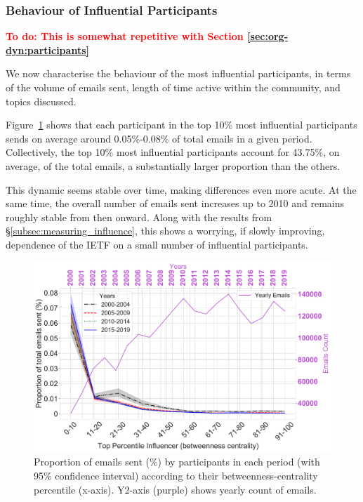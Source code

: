 \documentclass[twocolumn,10pt]{article}
\newlength{\figureWidthOneColumn}
\newcommand{\todo}[1]{\textbf{\textcolor{red}{To do: #1}}}
\newcommand{\pb}[1]{\vspace{0.75ex}\noindent{\textbf{#1}}}
\begin{document}
\subsubsection{Behaviour of Influential Participants}
\label{subsec:influencer_behaviour}

\todo{This is somewhat repetitive with Section \ref{sec:org-dyn:participants}}

We now characterise the behaviour of the most influential participants, in
terms of the volume of emails sent, length of time active within the
community, and topics discussed. 

\pb{Email volume}
Figure~\ref{fig:emailcount_top_percentile} shows that each participant in
the top 10\% most influential participants sends on average around
0.05\%-0.08\% of total emails in a given period.  Collectively, the top
10\% most influential participants account for 43.75\%, on average, of the
total emails, a substantially larger proportion than the others.

This dynamic seems stable over time, making differences even more acute.
At the same time, the overall number of emails sent increases up to 2010
and remains roughly stable from then onward.  Along with the results from
\S\ref{subsec:measuring_influence}, this shows a worrying, if slowly
improving, dependence of the IETF on a small number of influential
participants.

\begin{figure}
  \centering
  \includegraphics[width=\figureWidthOneColumn]{figures-prev/icwsm-2022/lineplot_proportion_emailscount_top_percentile.pdf}
  \caption{
    Proportion of emails sent (\%) by participants in each period (with
    95\% confidence interval) according to their betweenness-centrality
    percentile (x-axis).  Y2-axis (purple) shows yearly count of emails.
  }
  \label{fig:emailcount_top_percentile}
\end{figure}
\end{document}
